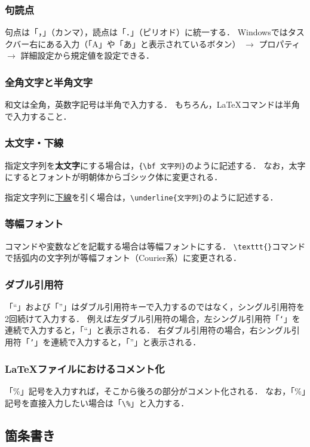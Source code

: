\documentclass[uplatex]{jsarticle}
\begin{document}
\subsubsection{句読点}
句点は「，」（カンマ），読点は「．」（ピリオド）に統一する．
Windowsではタスクバー右にある入力（「A」や「あ」と表示されているボタン） $\to$ プロパティ $\to$ 詳細設定から規定値を設定できる．

\subsubsection{全角文字と半角文字}
和文は全角，英数字記号は半角で入力する．
もちろん，\LaTeX コマンドは半角で入力すること．

\subsubsection{太文字・下線}
指定文字列を{\bf 太文字}にする場合は，\verb|{\bf 文字列}|のように記述する．
なお，太字にするとフォントが明朝体からゴシック体に変更される．

指定文字列に\underline{下線}を引く場合は，\verb|\underline{文字列}|のように記述する．

\subsubsection{等幅フォント}
コマンドや変数などを記載する場合は等幅フォントにする．
\verb|\texttt{}|コマンドで括弧内の文字列が等幅フォント（Courier系）に変更される．

\subsubsection{ダブル引用符}
「``」および「''」はダブル引用符キーで入力するのではなく，シングル引用符を2回続けて入力する．
例えば左ダブル引用符の場合，左シングル引用符「\texttt{`}」を連続で入力すると，「``」と表示される．
右ダブル引用符の場合，右シングル引用符「\texttt{'}」を連続で入力すると，「''」と表示される．

\subsubsection{\LaTeX ファイルにおけるコメント化}
「\%」記号を入力すれば，そこから後ろの部分がコメント化される．
なお，「\%」記号を直接入力したい場合は「\verb|\%|」と入力する．

\subsection{箇条書き}
\end{document}
